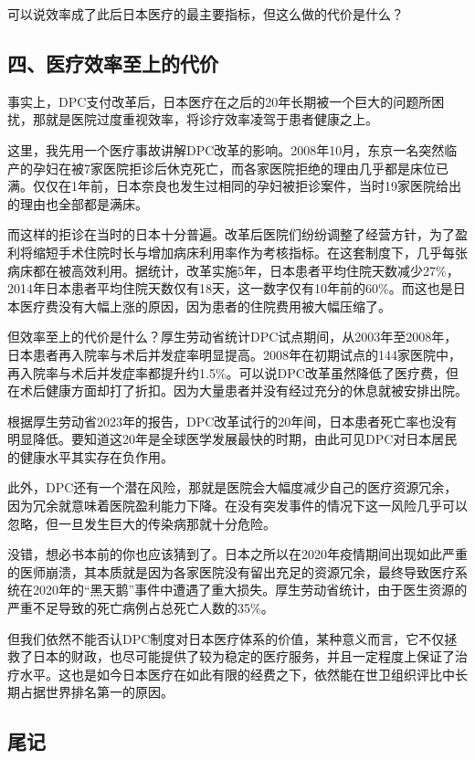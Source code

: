 可以说效率成了此后日本医疗的最主要指标，但这么做的代价是什么？

\subsection{四、医疗效率至上的代价}

事实上，DPC支付改革后，日本医疗在之后的20年长期被一个巨大的问题所困扰，那就是医院过度重视效率，将诊疗效率凌驾于患者健康之上。

这里，我先用一个医疗事故讲解DPC改革的影响。2008年10月，东京一名突然临产的孕妇在被7家医院拒诊后休克死亡，而各家医院拒绝的理由几乎都是床位已满。仅仅在1年前，日本奈良也发生过相同的孕妇被拒诊案件，当时19家医院给出的理由也全部都是满床。

而这样的拒诊在当时的日本十分普遍。改革后医院们纷纷调整了经营方针，为了盈利将缩短手术住院时长与增加病床利用率作为考核指标。在这套制度下，几乎每张病床都在被高效利用。据统计，改革实施5年，日本患者平均住院天数减少27\%，2014年日本患者平均住院天数仅有18天，这一数字仅有10年前的60\%。而这也是日本医疗费没有大幅上涨的原因，因为患者的住院费用被大幅压缩了。

但效率至上的代价是什么？厚生劳动省统计DPC试点期间，从2003年至2008年，日本患者再入院率与术后并发症率明显提高。2008年在初期试点的144家医院中，再入院率与术后并发症率都提升约1.5\%。可以说DPC改革虽然降低了医疗费，但在术后健康方面却打了折扣。因为大量患者并没有经过充分的休息就被安排出院。

根据厚生劳动省2023年的报告，DPC改革试行的20年间，日本患者死亡率也没有明显降低。要知道这20年是全球医学发展最快的时期，由此可见DPC对日本居民的健康水平其实存在负作用。

此外，DPC还有一个潜在风险，那就是医院会大幅度减少自己的医疗资源冗余，因为冗余就意味着医院盈利能力下降。在没有突发事件的情况下这一风险几乎可以忽略，但一旦发生巨大的传染病那就十分危险。

没错，想必书本前的你也应该猜到了。日本之所以在2020年疫情期间出现如此严重的医师崩溃，其本质就是因为各家医院没有留出充足的资源冗余，最终导致医疗系统在2020年的“黑天鹅”事件中遭遇了重大损失。厚生劳动省统计，由于医生资源的严重不足导致的死亡病例占总死亡人数的35\%。

但我们依然不能否认DPC制度对日本医疗体系的价值，某种意义而言，它不仅拯救了日本的财政，也尽可能提供了较为稳定的医疗服务，并且一定程度上保证了治疗水平。这也是如今日本医疗在如此有限的经费之下，依然能在世卫组织评比中长期占据世界排名第一的原因。

\subsection{尾记}

